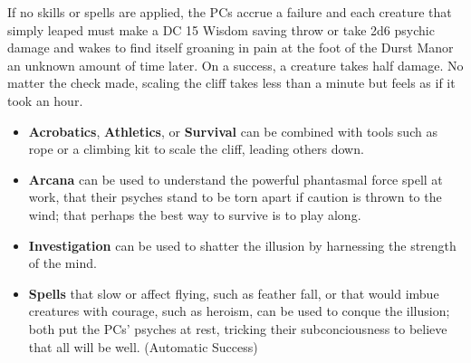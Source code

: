If no skills or spells are applied, the PCs accrue a failure and each creature that simply leaped must make a
DC 15 Wisdom saving throw or take 2d6 psychic damage and wakes to find itself groaning in pain at the foot of 
the Durst Manor an unknown amount of time later. On a success, a creature takes half damage. No matter the check
made, scaling the cliff takes less than a minute but feels as if it took an hour.
\begin{skillChallenge}
  \begin{itemize}
    \item \textbf{Acrobatics}, \textbf{Athletics}, or \textbf{Survival} can be combined with tools such as rope
    or a climbing kit to scale the cliff, leading others down. \moderateDC
    \item \textbf{Arcana} can be used to understand the powerful phantasmal force spell at work, that their
    psyches stand to be torn apart if caution is thrown to the wind; that perhaps the best way to survive is
    to play along. \moderateDC
    \item \textbf{Investigation} can be used to shatter the illusion by harnessing the strength of the mind.
    \hardDC
    \item \textbf{Spells} that slow or affect flying, such as feather fall, or that would imbue creatures with
    courage, such as heroism, can be used to conque the illusion; both put the PCs' psyches at rest, tricking
    their subconciousness to believe that all will be well. (Automatic Success)
  \end{itemize}
\end{skillChallenge}

\begin{arealinks}
  \item {}
\end{arealinks}
